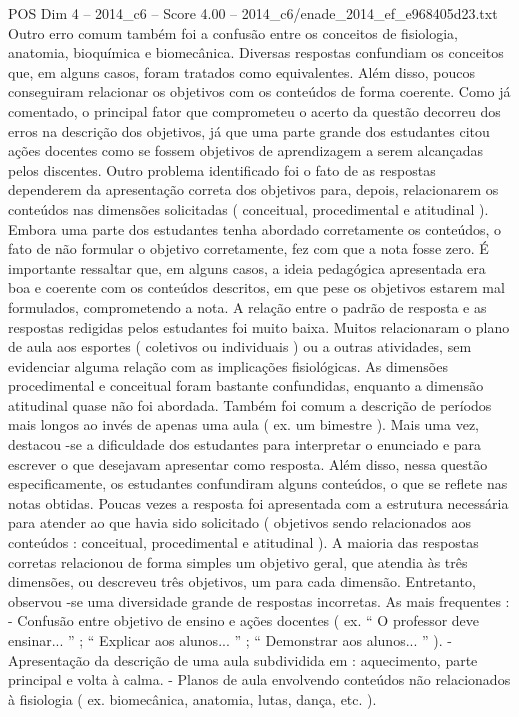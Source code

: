 \begin{textsample}{POS Dim 4 – 2014\_c6 – Score 4.00 – 2014\_c6/enade\_2014\_ef\_e968405d23.txt}
Outro erro comum também foi a confusão entre os conceitos de fisiologia, anatomia, bioquímica e biomecânica.
Diversas respostas confundiam os conceitos que, em alguns casos, foram tratados como equivalentes.
Além disso, poucos conseguiram relacionar os objetivos com os conteúdos de forma coerente.
Como já comentado, o principal fator que comprometeu o acerto da questão decorreu dos erros na descrição dos objetivos, já que uma parte grande dos estudantes citou ações docentes como se fossem objetivos de aprendizagem a serem alcançadas pelos discentes.
Outro problema identificado foi o fato de as respostas dependerem da apresentação correta dos objetivos para, depois, relacionarem os conteúdos nas dimensões solicitadas ( conceitual, procedimental e atitudinal ).
Embora uma parte dos estudantes tenha abordado corretamente os conteúdos, o fato de não formular o objetivo corretamente, fez com que a nota fosse zero.
É importante ressaltar que, em alguns casos, a ideia pedagógica apresentada era boa e coerente com os conteúdos descritos, em que pese os objetivos estarem mal formulados, comprometendo a nota.
A relação entre o padrão de resposta e as respostas redigidas pelos estudantes foi muito baixa.
Muitos relacionaram o plano de aula aos esportes ( coletivos ou individuais ) ou a outras atividades, sem evidenciar alguma relação com as implicações fisiológicas.
As dimensões procedimental e conceitual foram bastante confundidas, enquanto a dimensão atitudinal quase não foi abordada.
Também foi comum a descrição de períodos mais longos ao invés de apenas uma aula ( ex. um bimestre ).
Mais uma vez, destacou -se a dificuldade dos estudantes para interpretar o enunciado e para escrever o que desejavam apresentar como resposta.
Além disso, nessa questão especificamente, os estudantes confundiram alguns conteúdos, o que se reflete nas notas obtidas.
Poucas vezes a resposta foi apresentada com a estrutura necessária para atender ao que havia sido solicitado ( objetivos sendo relacionados aos conteúdos : conceitual, procedimental e atitudinal ).
A maioria das respostas corretas relacionou de forma simples um objetivo geral, que atendia às três dimensões, ou descreveu três objetivos, um para cada dimensão.
Entretanto, observou -se uma diversidade grande de respostas incorretas.
As mais frequentes : - Confusão entre objetivo de ensino e ações docentes ( ex. “ O professor deve ensinar... ” ; “ Explicar aos alunos... ” ; “ Demonstrar aos alunos... ” ). - Apresentação da descrição de uma aula subdividida em : aquecimento, parte principal e volta à calma. - Planos de aula envolvendo conteúdos não relacionados à fisiologia ( ex. biomecânica, anatomia, lutas, dança, etc. ).

\end{textsample}
